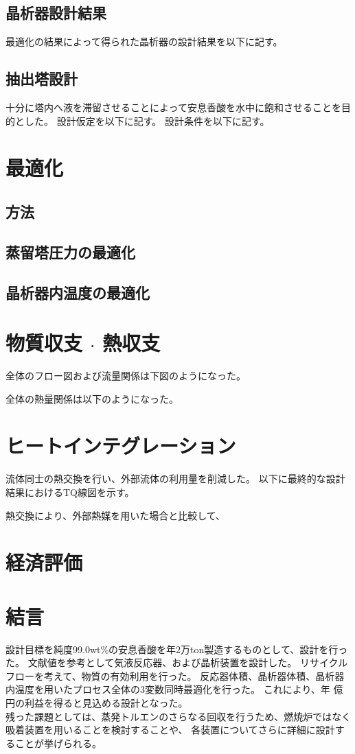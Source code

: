 \documentclass[a4j]{jsreport}
\begin{document}
\section{晶析器設計結果}
最適化の結果によって得られた晶析器の設計結果を以下に記す。

\section{抽出塔設計}
十分に塔内へ液を滞留させることによって安息香酸を水中に飽和させることを目的とした。
設計仮定を以下に記す。
設計条件を以下に記す。

\newpage
\chapter{最適化}
\section{方法}

\section{蒸留塔圧力の最適化}

\section{晶析器内温度の最適化}

\newpage
\chapter{物質収支 $\cdot$ 熱収支}
全体のフロー図および流量関係は下図のようになった。

全体の熱量関係は以下のようになった。

\newpage
\chapter{ヒートインテグレーション}
流体同士の熱交換を行い、外部流体の利用量を削減した。
以下に最終的な設計結果におけるTQ線図を示す。

熱交換により、外部熱媒を用いた場合と比較して、

\newpage
\chapter{経済評価}

\newpage
\chapter{結言}
設計目標を純度99.0wt\%の安息香酸を年2万ton製造するものとして、設計を行った。
文献値を参考として気液反応器、および晶析装置を設計した。
リサイクルフローを考えて、物質の有効利用を行った。
反応器体積、晶析器体積、晶析器内温度を用いたプロセス全体の3変数同時最適化を行った。
これにより、年 億円の利益を得ると見込める設計となった。\\
残った課題としては、蒸発トルエンのさらなる回収を行うため、燃焼炉ではなく吸着装置を用いることを検討することや、
各装置についてさらに詳細に設計することが挙げられる。
\end{document}
